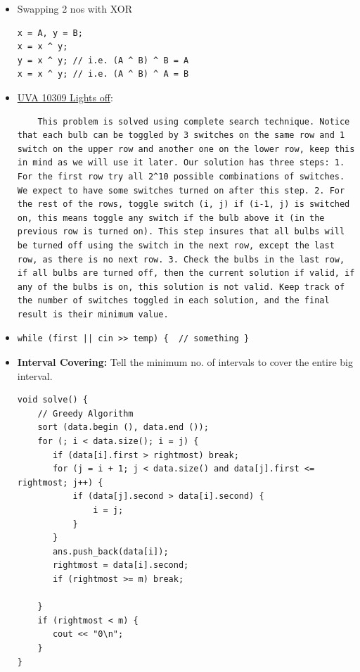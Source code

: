 \documentclass[8pt, a4paper, oneside, twocolumn]{extarticle}
\begin{document}
\begin{itemize}
    \item Swapping 2 nos with XOR
    \begin{verbatim}
x = A, y = B;
x = x ^ y;
y = x ^ y; // i.e. (A ^ B) ^ B = A
x = x ^ y; // i.e. (A ^ B) ^ A = B
    \end{verbatim}
    \item \href{}{UVA 10309 Lights off}:
    \begin{verbatim}
    This problem is solved using complete search technique. Notice that each bulb can be toggled by 3 switches on the same row and 1 switch on the upper row and another one on the lower row, keep this in mind as we will use it later. Our solution has three steps: 1. For the first row try all 2^10 possible combinations of switches. We expect to have some switches turned on after this step. 2. For the rest of the rows, toggle switch (i, j) if (i-1, j) is switched on, this means toggle any switch if the bulb above it (in the previous row is turned on). This step insures that all bulbs will be turned off using the switch in the next row, except the last row, as there is no next row. 3. Check the bulbs in the last row, if all bulbs are turned off, then the current solution if valid, if any of the bulbs is on, this solution is not valid. Keep track of the number of switches toggled in each solution, and the final result is their minimum value.
    \end{verbatim}
    \item \begin{verbatim}
while (first || cin >> temp) {  // something }
            \end{verbatim}
    \item \textbf{Interval Covering: }Tell the minimum no. of intervals to cover the entire big interval.
    \begin{verbatim}
void solve() {
    // Greedy Algorithm
    sort (data.begin (), data.end ()); 
    for (; i < data.size(); i = j) {
       if (data[i].first > rightmost) break;
       for (j = i + 1; j < data.size() and data[j].first <= rightmost; j++) {
           if (data[j].second > data[i].second) {
               i = j;
           }
       }
       ans.push_back(data[i]);
       rightmost = data[i].second;
       if (rightmost >= m) break;

    }
    if (rightmost < m) {
       cout << "0\n";
    }
}


\end{verbatim}
\end{itemize}
\end{document}
